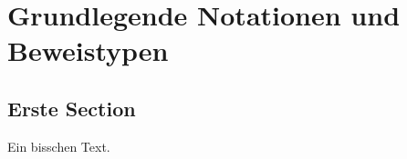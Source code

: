\documentclass[../main.tex]{subfiles}
\begin{document}
\chapter{Grundlegende Notationen und Beweistypen}
\section{Erste Section}
Ein bisschen Text.
\end{document}
